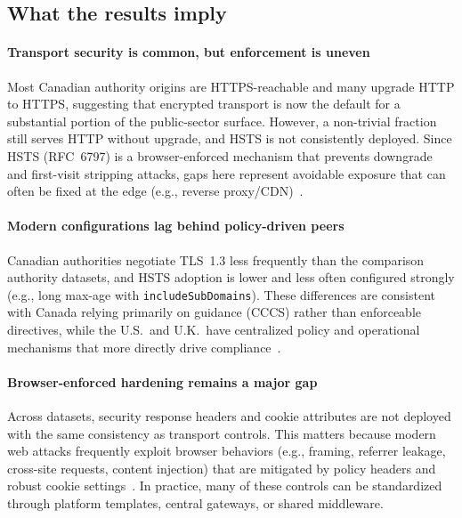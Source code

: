 \documentclass[conference]{IEEEtran}
\begin{document}
\subsection{What the results imply}
\paragraph{Transport security is common, but enforcement is uneven}
Most Canadian authority origins are HTTPS-reachable and many upgrade HTTP to HTTPS, suggesting that encrypted transport is now the default for a substantial portion of the public-sector surface. However, a non-trivial fraction still serves HTTP without upgrade, and HSTS is not consistently deployed. Since HSTS (RFC~6797) is a browser-enforced mechanism that prevents downgrade and first-visit stripping attacks, gaps here represent avoidable exposure that can often be fixed at the edge (e.g., reverse proxy/CDN)~\cite{rfc6797,mdn_sts_header}.

\paragraph{Modern configurations lag behind policy-driven peers}
Canadian authorities negotiate TLS~1.3 less frequently than the comparison authority datasets, and HSTS adoption is lower and less often configured strongly (e.g., long max-age with \texttt{includeSubDomains}). These differences are consistent with Canada relying primarily on guidance (CCCS) rather than enforceable directives, while the U.S.\ and U.K.\ have centralized policy and operational mechanisms that more directly drive compliance~\cite{cccs-itsp-40062,cccs-itsm-60005,omb-m-15-13,cisa_bod_18_01,uk-using-https-service-manual}.

\paragraph{Browser-enforced hardening remains a major gap}
Across datasets, security response headers and cookie attributes are not deployed with the same consistency as transport controls. This matters because modern web attacks frequently exploit browser behaviors (e.g., framing, referrer leakage, cross-site requests, content injection) that are mitigated by policy headers and robust cookie settings~\cite{owasp_http_security_response_headers,mdn_secure_cookie_configuration}. In practice, many of these controls can be standardized through platform templates, central gateways, or shared middleware.
\end{document}
